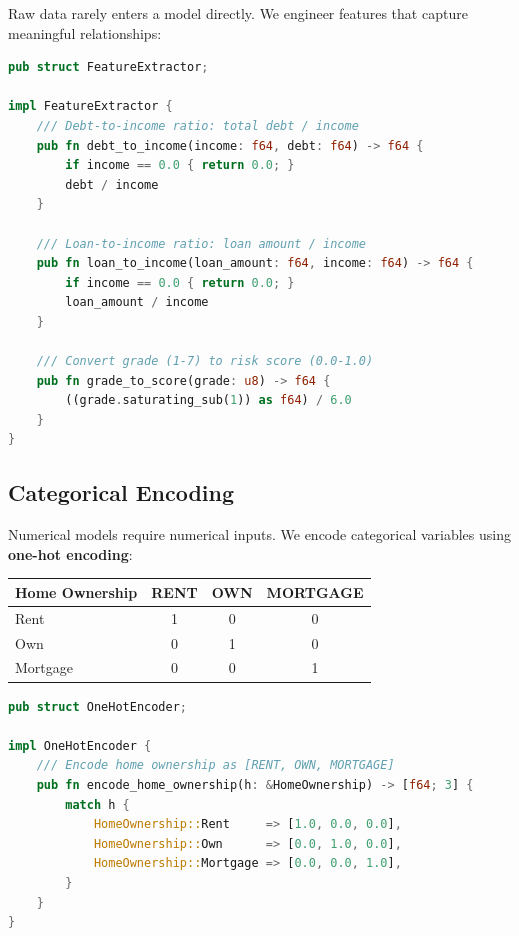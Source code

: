 Raw data rarely enters a model directly. We engineer features that capture
meaningful relationships:


\begin{lstlisting}[language=Rust]
pub struct FeatureExtractor;

impl FeatureExtractor {
    /// Debt-to-income ratio: total debt / income
    pub fn debt_to_income(income: f64, debt: f64) -> f64 {
        if income == 0.0 { return 0.0; }
        debt / income
    }

    /// Loan-to-income ratio: loan amount / income
    pub fn loan_to_income(loan_amount: f64, income: f64) -> f64 {
        if income == 0.0 { return 0.0; }
        loan_amount / income
    }

    /// Convert grade (1-7) to risk score (0.0-1.0)
    pub fn grade_to_score(grade: u8) -> f64 {
        ((grade.saturating_sub(1)) as f64) / 6.0
    }
}
\end{lstlisting}

\subsection{Categorical Encoding}

Numerical models require numerical inputs. We encode categorical variables
using \textbf{one-hot encoding}:

\begin{center}
\begin{tabular}{lccc}
\toprule
\textbf{Home Ownership} & \textbf{RENT} & \textbf{OWN} & \textbf{MORTGAGE} \\
\midrule
Rent     & 1 & 0 & 0 \\
Own      & 0 & 1 & 0 \\
Mortgage & 0 & 0 & 1 \\
\bottomrule
\end{tabular}
\end{center}

\begin{lstlisting}[language=Rust]
pub struct OneHotEncoder;

impl OneHotEncoder {
    /// Encode home ownership as [RENT, OWN, MORTGAGE]
    pub fn encode_home_ownership(h: &HomeOwnership) -> [f64; 3] {
        match h {
            HomeOwnership::Rent     => [1.0, 0.0, 0.0],
            HomeOwnership::Own      => [0.0, 1.0, 0.0],
            HomeOwnership::Mortgage => [0.0, 0.0, 1.0],
        }
    }
}
\end{lstlisting}

